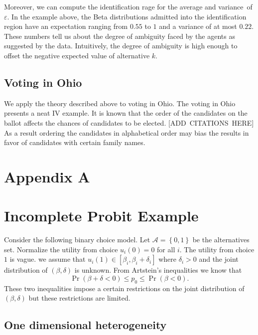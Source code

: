 \documentclass{article}
\begin{document}
Moreover, we can compute the identification rage for the average and
variance\ of $\varepsilon $. In the example above, the Beta distributions
admitted into the identification region have an expectation ranging from $%
0.55$ to $1$ and a variance of at most $0.22$. These numbers tell us about
the degree of ambiguity faced by the agents as suggested by the data.
Intuitively, the degree of ambiguity is high enough to offset the negative
expected value of alternative $k$.

\subsection{Voting in Ohio}

We apply the theory described above to voting in Ohio. The voting in Ohio
presents a neat IV example. It is known that the order of the candidates on
the ballot affects the chances of candidates to be elected. [ADD\ CITATIONS\
HERE] As a result ordering the candidates in alphabetical order may bias the
results in favor of candidates with certain family names.


\newpage \appendix

\section{Appendix A}

\section{Incomplete Probit Example}

Consider the following binary choice model. Let $\mathcal{A}=\left\{
0,1\right\} $ be the alternatives set. Normalize the utility from choice $%
u_{i}\left( 0\right) =0$ for all $i$. The utility from choice $1$ is vague.
we assume that $u_{i}\left( 1\right) \in \left[ \beta _{i},\beta _{i}+\delta
_{i}\right] $ where $\delta _{i}>0$ and the joint distribution of $\left(
\beta ,\delta \right) $ is unknown. From Artstein's inequalities we know that%
\begin{equation*}
\Pr \left( \beta +\delta <0\right) \leq p_{0}\leq \Pr \left( \beta <0\right)
.
\end{equation*}%
These two inequalities impose a certain restrictions on the joint
distribution of $\left( \beta ,\delta \right) $ but these restrictions are
limited.

\subsection{One dimensional heterogeneity}
\end{document}
